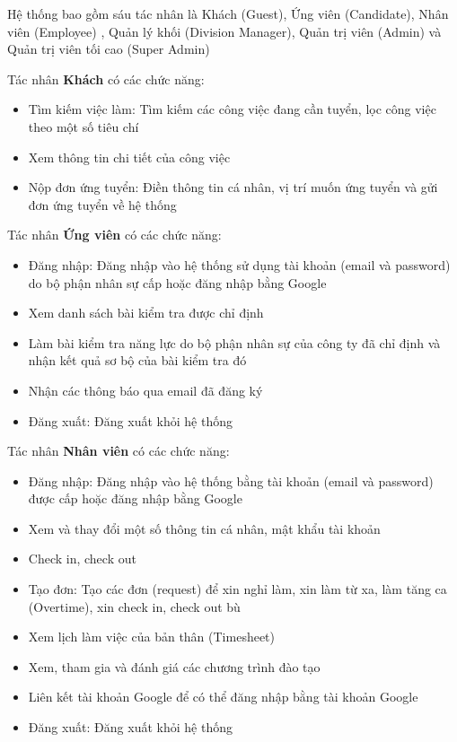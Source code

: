 \documentclass[../DoAn.tex]{subfiles}
\begin{document}
Hệ thống bao gồm sáu tác nhân là Khách (Guest), Ứng viên (Candidate), Nhân viên (Employee) , Quản lý khối (Division Manager), Quản trị viên (Admin) và Quản trị viên tối cao (Super Admin)

\noindent Tác nhân \textbf{Khách} có các chức năng:
\begin{itemize}
\item Tìm kiếm việc làm: Tìm kiếm các công việc đang cần tuyển, lọc công việc theo một số tiêu chí
\item Xem thông tin chi tiết của công việc
\item Nộp đơn ứng tuyển: Điền thông tin cá nhân, vị trí muốn ứng tuyển và gửi đơn ứng tuyển về hệ thống
\end{itemize}

\noindent Tác nhân \textbf{Ứng viên} có các chức năng:
\begin{itemize}
\item Đăng nhập: Đăng nhập vào hệ thống sử dụng tài khoản (email và password) do bộ phận nhân sự cấp hoặc đăng nhập bằng Google
\item Xem danh sách bài kiểm tra được chỉ định
\item Làm bài kiểm tra năng lực do bộ phận nhân sự của công ty đã chỉ định và nhận kết quả sơ bộ của bài kiểm tra đó
\item Nhận các thông báo qua email đã đăng ký
\item Đăng xuất: Đăng xuất khỏi hệ thống
\end{itemize}

\noindent Tác nhân \textbf{Nhân viên} có các chức năng:
\begin{itemize}
\item Đăng nhập: Đăng nhập vào hệ thống bằng tài khoản (email và password) được cấp hoặc đăng nhập bằng Google
\item Xem và thay đổi một số thông tin cá nhân, mật khẩu tài khoản
\item Check in, check out
\item Tạo đơn: Tạo các đơn (request) để xin nghỉ làm, xin làm từ xa, làm tăng ca (Overtime), xin check in, check out bù
\item Xem lịch làm việc của bản thân (Timesheet)
\item Xem, tham gia và đánh giá các chương trình đào tạo
\item Liên kết tài khoản Google để có thể đăng nhập bằng tài khoản Google
\item Đăng xuất: Đăng xuất khỏi hệ thống
\end{itemize}
\end{document}
